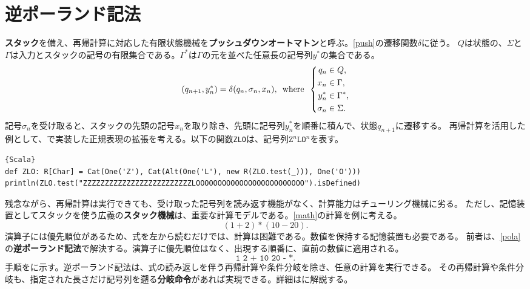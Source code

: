 \documentclass[10pt,a4paper]{book}
\begin{document}
\section{逆ポーランド記法\label{sect:pola}}

\textbf{スタック}を備え、再帰計算に対応した有限状態機械を\textbf{プッシュダウンオートマトン}と呼ぶ。\eqref{push}の遷移関数$\delta$に従う。
$Q$は状態の、$\Sigma$と$\Gamma$は入力とスタックの記号の有限集合である。$\Gamma^*$は$\Gamma$の元を並べた任意長の記号列$y^*$の集合である。
%
\begin{equation}
\label{eq:push}
(q_{n+1},y^*_n) = \delta(q_n,\sigma_n,x_n),
\enspace\mathrm{where}\enspace
\left\{
\begin{aligned}
q_n &\in Q,\\
x_n &\in \Gamma,\\
y^*_n &\in \Gamma^*,\\
\sigma_n &\in \Sigma.
\end{aligned}
\right.
\end{equation}
%
記号$\sigma_n$を受け取ると、スタックの先頭の記号$x_n$を取り除き、先頭に記号列$y^*_n$を順番に積んで、状態$q_{n+1}$に遷移する。
再帰計算を活用した例として、で実装した正規表現の拡張を考える。以下の関数\texttt{ZLO}は、記号列$\texttt{Z}^n\texttt{L}\texttt{O}^n$を表す。

\begin{Verbatim}{Scala}
def ZLO: R[Char] = Cat(One('Z'), Cat(Alt(One('L'), new R(ZLO.test(_))), One('O')))
println(ZLO.test("ZZZZZZZZZZZZZZZZZZZZZZZZZLOOOOOOOOOOOOOOOOOOOOOOOOO").isDefined)
\end{Verbatim}

残念ながら、再帰計算は実行できても、受け取った記号列を読み返す機能がなく、計算能力はチューリング機械に劣る。
ただし、記憶装置としてスタックを使う広義の\textbf{スタック機械}は、重要な計算モデルである。\eqref{math}の計算を例に考える。
%
\begin{equation}
\label{eq:math}
(1 + 2) * (10 - 20).
\end{equation}
%
演算子には優先順位があるため、式を左から読むだけでは、計算は困難である。数値を保持する記憶装置も必要である。
前者は、\eqref{pola}の\textbf{逆ポーランド記法}で解決する。演算子に優先順位はなく、出現する順番に、直前の数値に適用される。
%
\begin{equation}
\label{eq:pola}
\texttt{1 2 + 10 20 - *}.
\end{equation}
%
手順をに示す。逆ポーランド記法は、式の読み返しを伴う再帰計算や条件分岐を除き、任意の計算を実行できる。
その再帰計算や条件分岐も、指定された長さだけ記号列を遡る\textbf{分岐命令}があれば実現できる。詳細はに解説する。
\end{document}
